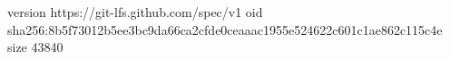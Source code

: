version https://git-lfs.github.com/spec/v1
oid sha256:8b5f73012b5ee3bc9da66ca2cfde0ceaaac1955e524622c601c1ae862c115c4e
size 43840
